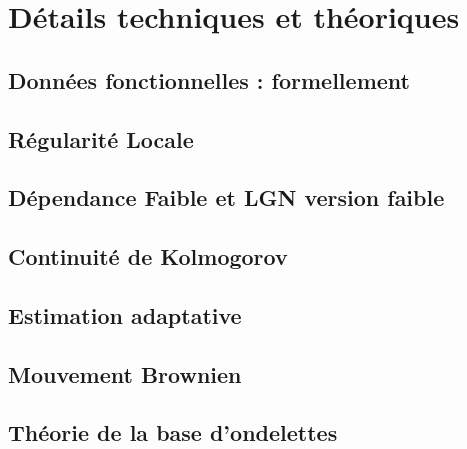 \chapter{Détails techniques et théoriques}

\section{Données fonctionnelles : formellement}
\label{annexe:fda-formel}


\section{Régularité Locale}
\label{annexe:regularite-locale}

\pagebreak


\section{Dépendance Faible et LGN version faible}
\label{annexe:weak_dep}






\section{Continuité de Kolmogorov}
\label{annexe:continuite_kolmogorov}


\section{Estimation adaptative}
\label{annexe:estim_adapt}


\section{Mouvement Brownien}
\label{annexe:brownien}


\section{Théorie de la base d'ondelettes}
\label{annexe:wavelet}


